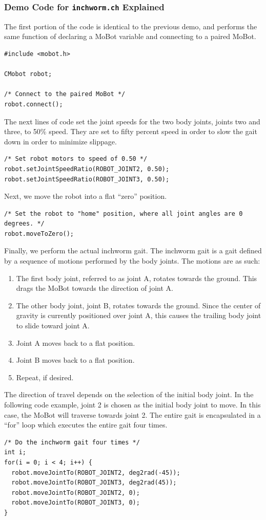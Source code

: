\documentclass{article}
\begin{document}
\subsubsection{Demo Code for \texttt{inchworm.ch} Explained}
The first portion of the code is identical to the previous demo, and performs
the same function of declaring a MoBot variable and connecting to a 
paired MoBot.
\begin{verbatim}
#include <mobot.h>

CMobot robot;

/* Connect to the paired MoBot */
robot.connect();
\end{verbatim}

The next lines of code set the joint speeds for the two body joints, joints 
two and three, to 50\% speed. They are set to fifty percent speed in order to 
slow the gait down in order to minimize slippage.

\begin{verbatim}
/* Set robot motors to speed of 0.50 */
robot.setJointSpeedRatio(ROBOT_JOINT2, 0.50);
robot.setJointSpeedRatio(ROBOT_JOINT3, 0.50);
\end{verbatim}

Next, we move the robot into a flat ``zero'' position.

\begin{verbatim}
/* Set the robot to "home" position, where all joint angles are 0 degrees. */
robot.moveToZero();
\end{verbatim}

Finally, we perform the actual inchworm gait. The inchworm gait is a gait defined
by a sequence of motions performed by the body joints. The motions are as such:
\begin{enumerate}
\item The first body joint, referred to as joint A, rotates towards the ground.
This drags the MoBot towards the direction of joint A.
\item The other body joint, joint B, rotates towards the ground. Since the center
of gravity is currently positioned over joint A, this causes the trailing body 
joint to slide toward joint A.
\item Joint A moves back to a flat position.
\item Joint B moves back to a flat position.
\item Repeat, if desired.
\end{enumerate}
The direction of travel depends on the selection of the initial body joint. In
the following code example, joint 2 is chosen as the initial body joint to move.
In this case, the MoBot will traverse towards joint 2. The entire gait is
encapsulated in a ``for'' loop which executes the entire gait four times.
\begin{verbatim}
/* Do the inchworm gait four times */
int i;
for(i = 0; i < 4; i++) {
  robot.moveJointTo(ROBOT_JOINT2, deg2rad(-45));
  robot.moveJointTo(ROBOT_JOINT3, deg2rad(45));
  robot.moveJointTo(ROBOT_JOINT2, 0);
  robot.moveJointTo(ROBOT_JOINT3, 0);
}
\end{verbatim}
\end{document}
